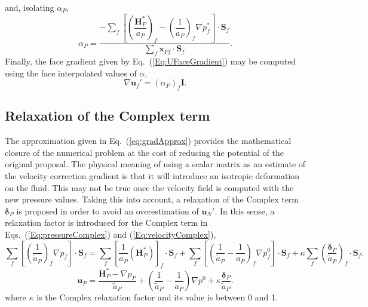 \documentclass[final,3p,times,11pt,onecolumn]{myElsarticle}
\numberwithin{equation}{section}
\begin{document}
and, isolating $\alpha_P$,
\begin{equation}
\displaystyle 
\alpha_P
=
\dfrac
{-\displaystyle \sum_f
\left[
\left(\dfrac{\boldsymbol{H}_P^*}{a_P}\right)_f 
 -
 \left(\dfrac{1}{a_P}\right)_f \nabla p_f^{*}
 \right]
\cdot 
\boldsymbol{S}_f}
{\displaystyle\sum_f 
\boldsymbol{x}_{Pf}
\cdot 
\boldsymbol{S}_f}.
\end{equation}
Finally, the face gradient given by Eq.~(\ref{Eq:UFaceGradient}) may be computed using the face interpolated values of $\alpha$,
\begin{equation}
\label{Eq:scalarMatrix}
\nabla \boldsymbol{u}_f'
=
\left(
\alpha_P
\right)_f
\boldsymbol{I}.
\end{equation}

\subsection{Relaxation of the Complex term}
The approximation given in Eq.~(\ref{eq:gradApprox}) provides the mathematical closure of the numerical problem at the cost of reducing the potential of the original proposal. The physical meaning of using a scalar matrix as an estimate of the velocity correction gradient is that it will introduce an isotropic deformation on the fluid. This may not be true once the velocity field is computed with the new pressure values. Taking this into account, a relaxation of the Complex term $\boldsymbol{\delta}_P$ is proposed in order to avoid an overestimation of $\boldsymbol{u}_N'$. In this sense, a relaxation factor is introduced for the Complex term in Eqs.~(\ref{Eq:pressureComplex}) and (\ref{Eq:velocityComplex}), 
\begin{equation}
\label{Eq:pressureComplexRelaxed}
\sum_f
\left[
\left(
\dfrac
{1}
{\tilde{a}_P}
\right)_f
\nabla p_f
\right]
\cdot 
\boldsymbol{S}_f
= 
\sum_f 
\left[
\dfrac{1}{a_P}
\left(
\boldsymbol{H}_P^*
\right)
\right]_f 
\cdot
\boldsymbol{S}_f
+
\sum_f
\left[
\left(
\dfrac
{1}
{\tilde{a}_P}
-
\dfrac
{1}
{a_P}
\right)_f
\nabla p^{0}_f
\right]
\cdot
\boldsymbol{S}_f
+
\kappa
\sum_f
\left(
\dfrac{\boldsymbol{\delta}_P}{\tilde{a}_P}
\right)_f
\cdot
\boldsymbol{S}_f.
\end{equation}
\begin{equation}
\label{Eq:velocityComplexRelaxed}
\boldsymbol{u}_P 
=
\dfrac
{
\boldsymbol{H}_P^*
- 
\nabla p_P}
{\tilde{a}_P}
+
\left(
\dfrac{1}
{\tilde{a}_P}
-
\dfrac{1}
{a_P}
\right)
\nabla p^{0}
+
\kappa
\dfrac{\boldsymbol{\delta}_P}
{\tilde{a}_P}.
\end{equation}
where $\kappa$ is the Complex relaxation factor and its value is between 0 and 1.
\end{document}
